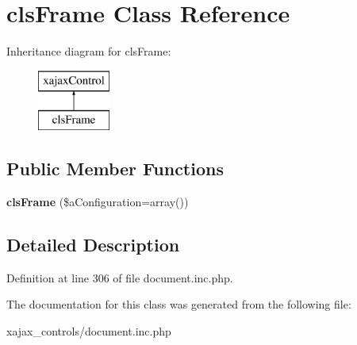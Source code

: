 \hypertarget{classclsFrame}{
\section{clsFrame Class Reference}
\label{classclsFrame}
}
Inheritance diagram for clsFrame:\begin{figure}[H]
\begin{center}
\leavevmode
\includegraphics[height=2.000000cm]{classclsFrame}
\end{center}
\end{figure}
\subsection*{Public Member Functions}
\begin{DoxyCompactItemize}
\item 
\hypertarget{classclsFrame_aa63d9453d7cd8a8fd4bf9d5da33affe9}{
{\bfseries clsFrame} (\$aConfiguration=array())}
\label{classclsFrame_aa63d9453d7cd8a8fd4bf9d5da33affe9}

\end{DoxyCompactItemize}


\subsection{Detailed Description}


Definition at line 306 of file document.inc.php.



The documentation for this class was generated from the following file:\begin{DoxyCompactItemize}
\item 
xajax\_\-controls/document.inc.php\end{DoxyCompactItemize}
